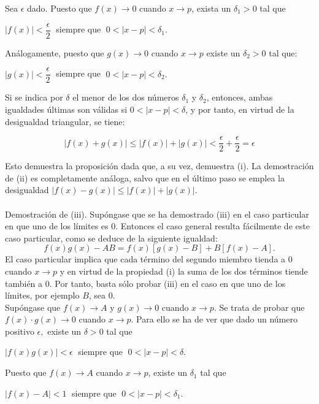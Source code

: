 Sea $\epsilon$ dado. Puesto que $f(x)\to 0$ cuando $x\to p$, exista un $\delta_1>0$ tal que 

\begin{center}
    $|f(x)|<\dfrac{\epsilon}{2}\;$ siempre que $\; 0<|x-p|<\delta_1.$
\end{center}

Análogamente, puesto que $g(x)\to 0$ cuando $x\to p$ existe un $\delta_2>0$ tal que:

\begin{center}
    $|g(x)|<\dfrac{\epsilon}{2}\;$ siempre que $\; 0<|x-p|<\delta_2.$
\end{center}

Si se indica por $\delta$ el menor de los dos números $\delta_1$ y $\delta_2$, entonces, ambas igualdades últimas son válidas si $0<|x-p|<\delta$, y por tanto, en virtud de la desigualdad triangular, se tiene:

$$|f(x)+g(x)|\leq |f(x)|+|g(x)|<\dfrac{\epsilon}{2}+\dfrac{\epsilon}{2}=\epsilon$$

Esto demuestra la proposición dada que, a su vez, demuestra (i). La demostración de (ii) es completamente análoga, salvo que en el último paso se emplea la desigualdad $|f(x)-g(x)|\leq |f(x)|+|g(x)|.$\\\\

Demostración de (iii). Supóngase que se ha demostrado (iii) en el caso particular en que uno de los límites es $0$. Entonces el caso general resulta fácilmente de este caso particular, como se deduce de la siguiente igualdad:
$$f(x)g(x)-AB = f(x)[g(x)-B]+B[f(x)-A].$$
El caso particular implica que cada término del segundo miembro tienda a $0$ cuando $x\to p$ y en virtud de la propiedad (i) la suma de los dos términos tiende también a $0$. Por tanto, basta sólo probar (iii) en el caso en que uno de los límites, por ejemplo $B$, sea $0$.\\
Supóngase que $f(x)\to A$ y $g(x)\to 0$ cuando $x\to p$. Se trata de probar que $f(x)\cdot g(x)\to 0$ cuando $x\to p.$ Para ello se ha de ver que dado un número positivo $\epsilon,$ existe un $\delta>0$ tal que 
\begin{center}
$|f(x)g(x)|<\epsilon\;$ siempre que $\;0<|x-p|<\delta.$
\end{center}

Puesto que $f(x)\to A$ cuando $x\to p$, existe un $\delta_1$ tal que 

\begin{center}
    $|f(x)-A|<1\;$ siempre que $\; 0<|x-p|<\delta_1.$
\end{center}

